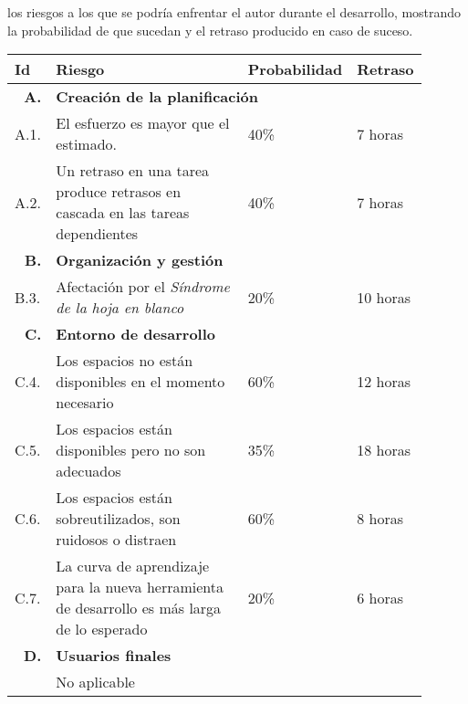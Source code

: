 	los riesgos a los que se podría enfrentar el autor durante el desarrollo, mostrando la probabilidad de que sucedan y el retraso producido en caso de suceso.
	
	\begin{table}[H]
	  \centering 
	  \begin{tabular}{p{0.1\linewidth}p{0.5\linewidth}p{0.15\linewidth}p{0.15\linewidth}}
  	    \multicolumn{1}{l}{\cellcolor{black!30}\textbf{Id}} &
	    \multicolumn{1}{l}{\cellcolor{black!30}\textbf{Riesgo}} & 
	 	\multicolumn{1}{c}{\cellcolor{black!30}\textbf{Probabilidad}} &
 	 	\multicolumn{1}{c}{\cellcolor{black!30}\textbf{Retraso}}
	 	\\	 
	    \toprule
   	    
   	    \multicolumn{1}{r}{\cellcolor{black!30}\textbf{A. }} &
		\multicolumn{3}{l}{\cellcolor{black!30}\textbf{Creación de la planificación}}\\
		A.1. &El esfuerzo es mayor que el estimado.											&	40\%	&	7 horas\\
		A.2. &Un retraso en una tarea produce retrasos en cascada en las tareas dependientes 	&	40\%	&	7 horas\\
		
		\multicolumn{1}{r}{\cellcolor{black!30}\textbf{B. }} &
		\multicolumn{3}{l}{\cellcolor{black!30}\textbf{Organización y gestión}}\\
		B.3. &Afectación por el \textit{Síndrome de la hoja en blanco}							&	20\%	&	10 horas\\
		
		\multicolumn{1}{r}{\cellcolor{black!30}\textbf{C. }} &
		\multicolumn{3}{l}{\cellcolor{black!30}\textbf{Entorno de desarrollo}}\\
		C.4. &Los espacios no están disponibles en el momento necesario						&	60\%	&	12 horas\\
		C.5. &Los espacios están disponibles pero no son adecuados								&	35\%	&	18 horas\\
		C.6. &Los espacios están sobreutilizados, son ruidosos o distraen						&	60\%	&	8 horas\\
		C.7. &La curva de aprendizaje para la nueva herramienta de desarrollo es más larga de lo esperado	&	20\%	&	6 horas\\
		
		\multicolumn{1}{r}{\cellcolor{black!30}\textbf{D. }} &
		\multicolumn{3}{l}{\cellcolor{black!30}\textbf{Usuarios finales}}\\
		&No aplicable&&\\
		

\end{tabular}
\end{table}
